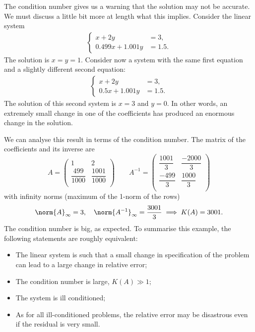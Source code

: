 The condition number gives us a warning that the solution may not be
accurate.     We must discuss a little bit more at length what this
implies.     Consider the linear system
%
\begin{align}
  \left\{
    \begin{aligned}
      x + 2 y & = 3 , \\
      0.499 x + 1.001 y & = 1.5 .
    \end{aligned} \right.
 \label{ill_cond_1}
\end{align}
%
The solution is $x = y = 1$.       Consider now a system with the same
first equation and a slightly different second equation:
%
\begin{align}
  \left\{
    \begin{aligned}
      x + 2 y & = 3 , \\
      0.5 x + 1.001 y & = 1.5 .
    \end{aligned} \right.
 \label{ill_cond_2}
\end{align}
%
The solution of this second system is $x = 3$ and $y=0$.    In other
words, an extremely small change in one of the coefficients has
produced an enormous change in the solution.

We can analyse this result in terms of the condition number.   The
matrix of the coefficients and its inverse are
%
\begin{equation*}
  A =
  \begin{pmatrix}
    1 & 2 \\
    \dfrac{499}{1000} & \dfrac{1001}{1000} \\
  \end{pmatrix}
  \qquad
  A^{-1} =
  \begin{pmatrix}
   \dfrac{1001}{3} & \dfrac{-2000}{3} \\
   \dfrac{-499}{3} & \dfrac{1000}{3} \\
  \end{pmatrix}
\end{equation*}
%
with infinity norms (maximum of the 1-norm of the rows)
%
\begin{equation*}
  \norm{ A }_\infty = 3 , \quad \norm{ A^{-1} }_\infty = \frac{3001}{3}
  \implies K(A) = 3001 .
\end{equation*}
%
The condition number is big, as expected. To summarise this example,
the following statements are roughly equivalent:
%
\begin{itemize}
%
\item The linear system is such that a small change in specification of
the problem can lead to a large change in relative error; \par
%
\item The condition number is large, $K(A) \gg 1$; \par
%
\item The system is ill conditioned; \par
%
\item As for all ill-conditioned problems, the relative error may be
disastrous even if the residual is very small.
%
\end{itemize}

